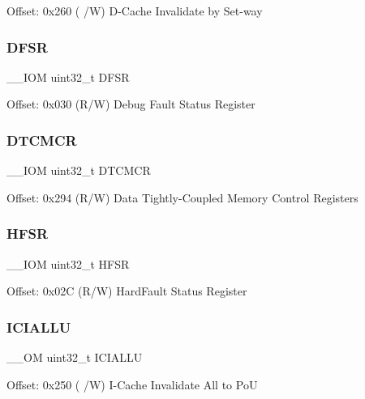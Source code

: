 Offset\+: 0x260 ( /W) D-\/\+Cache Invalidate by Set-\/way \mbox{\label{struct_s_c_b___type_a3b590075aa07880ce686d5cfb4e61c5c}} 
\subsubsection{\texorpdfstring{DFSR}{DFSR}}
{\footnotesize\ttfamily \+\_\+\+\_\+\+I\+OM uint32\+\_\+t D\+F\+SR}

Offset\+: 0x030 (R/W) Debug Fault Status Register \mbox{\label{struct_s_c_b___type_ad5a9c8098433fa3ac108487e0ccd9cfc}} 
\subsubsection{\texorpdfstring{DTCMCR}{DTCMCR}}
{\footnotesize\ttfamily \+\_\+\+\_\+\+I\+OM uint32\+\_\+t D\+T\+C\+M\+CR}

Offset\+: 0x294 (R/W) Data Tightly-\/\+Coupled Memory Control Registers \mbox{\label{struct_s_c_b___type_ab974e7ceb2e52a3fbcaa84e06e52922d}} 
\subsubsection{\texorpdfstring{HFSR}{HFSR}}
{\footnotesize\ttfamily \+\_\+\+\_\+\+I\+OM uint32\+\_\+t H\+F\+SR}

Offset\+: 0x02C (R/W) Hard\+Fault Status Register \mbox{\label{struct_s_c_b___type_a011024c365e7c5bd13a63830af60b10c}} 
\subsubsection{\texorpdfstring{ICIALLU}{ICIALLU}}
{\footnotesize\ttfamily \+\_\+\+\_\+\+OM uint32\+\_\+t I\+C\+I\+A\+L\+LU}

Offset\+: 0x250 ( /W) I-\/\+Cache Invalidate All to PoU \mbox{\label{struct_s_c_b___type_a1a8ecda7b1e4a1100dd82fc694bb4eb5}} 
